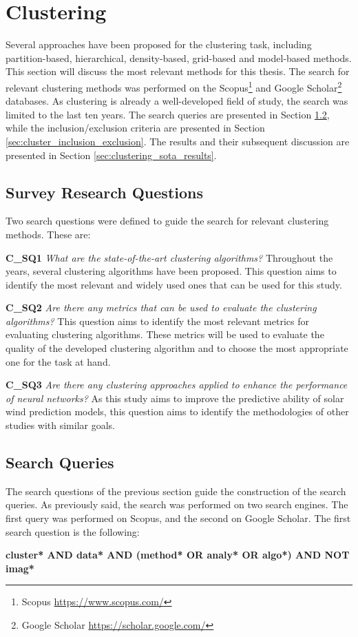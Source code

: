 \section{Clustering }\label{sec:sota_clustering}
Several approaches have been proposed for the clustering task, including partition-based, hierarchical, density-based, grid-based and model-based methods. This section will discuss the most relevant methods for this thesis. The search for relevant clustering methods was performed on the Scopus\footnote{Scopus \url{https://www.scopus.com/}} and Google Scholar\footnote{Google Scholar \url{https://scholar.google.com/}} databases. As clustering is already a well-developed field of study, the search was limited to the last ten years. The search queries are presented in Section \ref{sec:cluster_search_queries}, while the inclusion/exclusion criteria are presented in Section \ref{sec:cluster_inclusion_exclusion}. The results and their subsequent discussion are presented in Section \ref{sec:clustering_sota_results}.

\subsection{Survey Research Questions}\label{sec:cluster_search_questions}
Two search questions were defined to guide the search for relevant clustering methods. These are:

\noindent\textbf{C\_SQ1} \textit{What are the state-of-the-art clustering algorithms?} Throughout the years, several clustering algorithms have been proposed. This question aims to identify the most relevant and widely used ones that can be used for this study.

\noindent\textbf{C\_SQ2} \textit{Are there any metrics that can be used to evaluate the clustering algorithms?} This question aims to identify the most relevant metrics for evaluating clustering algorithms. These metrics will be used to evaluate the quality of the developed clustering algorithm and to choose the most appropriate one for the task at hand.

\noindent\textbf{C\_SQ3} \textit{Are there any clustering approaches applied to enhance the performance of neural networks?} As this study aims to improve the predictive ability of solar wind prediction models, this question aims to identify the methodologies of other studies with similar goals.

\subsection{Search Queries}\label{sec:cluster_search_queries}
The search questions of the previous section guide the construction of the search queries. As previously said, the search was performed on two search engines. The first query was performed on Scopus, and the second on Google Scholar. The first search question is the following:
\begin{center}
    \textbf{cluster* AND data* AND (method* OR analy* OR algo*) AND NOT imag*}
\end{center}

